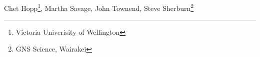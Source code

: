Chet Hopp\footnote{\label{note1}Victoria Univerisity of Wellington}, Martha Savage\footnotemark[\ref{note1}], John Townend\footnotemark[\ref{note1}], Steve Sherburn\footnote{GNS Science, Wairakei}